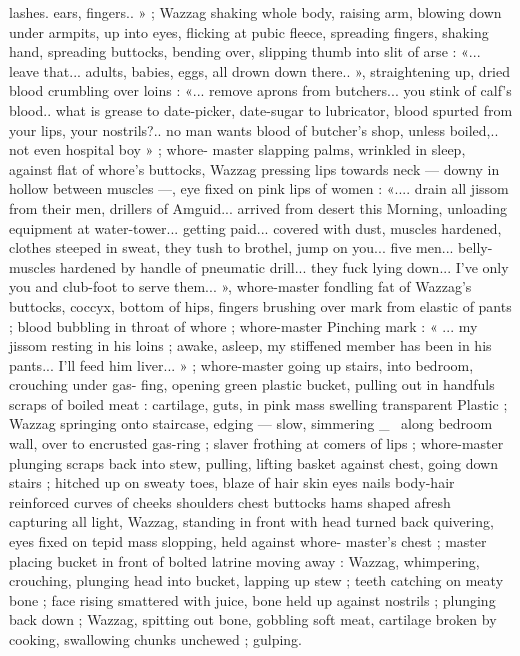 lashes. ears, fingers.. » ; Wazzag shaking whole body, raising arm,
blowing down under armpits, up into eyes, flicking at pubic fleece,
spreading fingers, shaking hand, spreading buttocks, bending over,
slipping thumb into slit of arse : «... leave that... adults, babies, eggs,
all drown down there.. », straightening up, dried blood crumbling
over loins : «... remove aprons from butchers... you stink of calf’s
blood.. what is grease to date-picker, date-sugar to lubricator, blood
spurted from your lips, your nostrils?.. no man wants blood of
butcher's shop, unless boiled,.. not even hospital boy » ; whore-
master slapping palms, wrinkled in sleep, against flat of whore's
buttocks, Wazzag pressing lips towards neck --- downy in hollow
between muscles ---, eye fixed on pink lips of women : «.... drain all
jissom from their men, drillers of Amguid... arrived from desert this
Morning, unloading equipment at water-tower... getting paid...
covered with dust, muscles hardened, clothes steeped in sweat, they
tush to brothel, jump on you... five men... belly-muscles hardened by
handle of pneumatic drill... they fuck lying down... I've only you and
club-foot to serve them... », whore-master fondling fat of Wazzag's
buttocks, coccyx, bottom of hips, fingers brushing over mark from
elastic of pants ; blood bubbling in throat of whore ; whore-master
Pinching mark : « ... my jissom resting in his loins ; awake, asleep, my
stiffened member has been in his pants... I'll feed him liver... » ;
whore-master going up stairs, into bedroom, crouching under gas-
fing, opening green plastic bucket, pulling out in handfuls scraps of
boiled meat : cartilage, guts, in pink mass swelling transparent
Plastic ; Wazzag springing onto staircase, edging --- slow, simmering
_~ along bedroom wall, over to encrusted gas-ring ; slaver frothing
at comers of lips ; whore-master plunging scraps back into stew,
pulling, lifting basket against chest, going down stairs ; hitched up
on sweaty toes, blaze of hair skin eyes nails body-hair reinforced
curves of cheeks shoulders chest buttocks hams shaped afresh
capturing all light, Wazzag, standing in front with head turned back
quivering, eyes fixed on tepid mass slopping, held against whore-
master’s chest ; master placing bucket in front of bolted latrine
moving away : Wazzag, whimpering, crouching, plunging head into
bucket, lapping up stew ; teeth catching on meaty bone ; face rising
smattered with juice, bone held up against nostrils ; plunging back
down ; Wazzag, spitting out bone, gobbling soft meat, cartilage
broken by cooking, swallowing chunks unchewed ; gulping.

